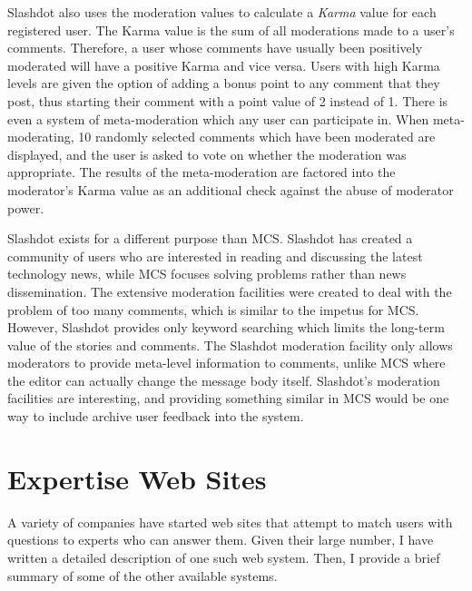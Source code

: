 Slashdot also uses the moderation values to calculate a {\it Karma} value for
each registered user. The Karma value is the sum of all moderations made to a
user's comments. Therefore, a user whose comments have usually been positively
moderated will have a positive Karma and vice versa. Users with high Karma
levels are given the option of adding a bonus point to any comment that they
post, thus starting their comment with a point value of 2 instead of 1. There
is even a system of meta-moderation which any user can participate in. When
meta-moderating, 10 randomly selected comments which have been moderated are
displayed, and the user is asked to vote on whether the moderation was
appropriate. The results of the meta-moderation are factored into the
moderator's Karma value as an additional check against the abuse of moderator
power.

Slashdot exists for a different purpose than MCS. Slashdot has created a
community of users who are interested in reading and discussing the latest
technology news, while MCS focuses solving problems rather than news
dissemination. The extensive moderation facilities were created to deal with
the problem of too many comments, which is similar to the impetus for MCS.
However, Slashdot provides only keyword searching which limits the long-term
value of the stories and comments. The Slashdot moderation facility only allows
moderators to provide meta-level information to comments, unlike MCS where the
editor can actually change the message body itself. Slashdot's moderation
facilities are interesting, and providing something similar in MCS would be one
way to include archive user feedback into the system.

\section{Expertise Web Sites}
A variety of companies have started web sites that attempt to match users with
questions to experts who can answer them. Given their large number, I have
written a detailed description of one such web system. Then, I provide a brief
summary of some of the other available systems.

